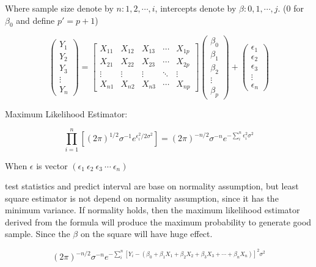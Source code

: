 \documentclass[12pt]{article}
\begin{document}
Where sample size denote by $n: 1, 2, \cdots, i$, intercepts denote by $\beta: 0, 1, \cdots, j$. (0 for $\beta_0$ and define 
$p' = p + 1$)

\[
\begin{pmatrix}
Y_1 \\
Y_2 \\
Y_3 \\
\vdots \\
Y_n
\end{pmatrix}
=
\begin{bmatrix}
X_{11} & X_{12} & X_{13} & \cdots & X_{1p} \\
X_{21} & X_{22} & X_{23} & \cdots & X_{2p} \\
\vdots & \vdots & \vdots & \ddots & \vdots \\
X_{n1} & X_{n2} & X_{n3} & \cdots & X_{np}
\end{bmatrix}
\begin{pmatrix}
\beta_0 \\
\beta_1 \\
\beta_2 \\
\vdots  \\
\beta_p
\end{pmatrix}
+
\begin{pmatrix}
\epsilon_1 \\
\epsilon_2 \\
\epsilon_3 \\
\vdots  \\
\epsilon_n
\end{pmatrix}
\]

Maximum Likelihood Estimator:

$$\prod^n_{i=1}[(2\pi)^{1/2} \sigma^{-1} e^{\epsilon^2_i/2\sigma^2}] = (2\pi)^{-n/2} \sigma^{-n} e^{-\sum^n_i \epsilon^2_i\sigma^2}$$
\begin{center}
When $\epsilon$ is vector $(\epsilon_1 \ \epsilon_2 \ \epsilon_3  \ \cdots \ \epsilon_n)$
\end{center}



test statistics and predict interval are base on normality assumption, but least square estimator is not depend on normality assumption, since it has the minimum variance.
If normality holds, then the maximum likelihood estimator derived from the formula will produce the maximum probability to generate good sample. Since the $\beta$ on the square will have huge effect.

$$(2\pi)^{-n/2} \sigma^{-n} e^{-\sum^n_i \left[Y_i - \left(\beta_0 + \beta_1 X_1 + \beta_2 X_2 + \beta_3 X_3 + \cdots + \beta_n X_n \right) \right]^2\sigma^2}$$
\end{document}
